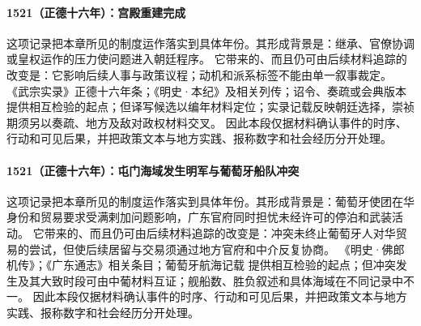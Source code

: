 \paragraph{1521（正德十六年）：宫殿重建完成} 这项记录把本章所见的制度运作落实到具体年份。其形成背景是：继承、官僚协调或皇权运作的压力使问题进入朝廷程序。 它带来的、而且仍可由后续材料追踪的改变是：它影响后续人事与政策议程；动机和派系标签不能由单一叙事裁定。 《武宗实录》正德十六年条；《明史·本纪》及相关列传；诏令、奏疏或会典版本 提供相互检验的起点；但译写候选以编年材料定位；实录记载反映朝廷选择，崇祯期须另以奏疏、地方及敌对政权材料交叉。 因此本段仅据材料确认事件的时序、行动和可见后果，并把政策文本与地方实践、报称数字和社会经历分开处理。

\paragraph{1521（正德十六年）：屯门海域发生明军与葡萄牙船队冲突} 这项记录把本章所见的制度运作落实到具体年份。其形成背景是：葡萄牙使团在华身份和贸易要求受满剌加问题影响，广东官府同时担忧未经许可的停泊和武装活动。 它带来的、而且仍可由后续材料追踪的改变是：冲突未终止葡萄牙人对华贸易的尝试，但使后续居留与交易须通过地方官府和中介反复协商。 《明史·佛郎机传》；《广东通志》相关条目；葡萄牙航海记载 提供相互检验的起点；但冲突发生及其大致时段可由中葡材料互证；舰船数、胜负叙述和具体海域在不同记录中不一。 因此本段仅据材料确认事件的时序、行动和可见后果，并把政策文本与地方实践、报称数字和社会经历分开处理。
